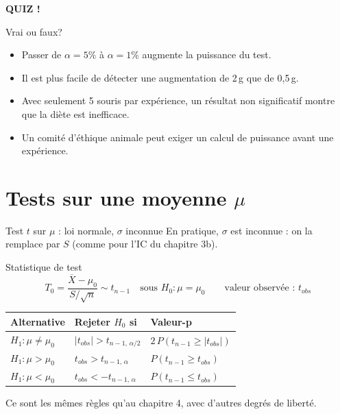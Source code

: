 \documentclass{BeamerTemplate}
\begin{document}
\begin{frame}[plain,t]
  \centerline{\LARGE\bfseries\alert{QUIZ !}}

  \medskip
  Vrai ou faux?
  \begin{itemize}\itemsep 1.1cm
    \item Passer de $\alpha = 5\%$ à $\alpha = 1\%$ augmente la puissance du test.
    \item<2-> Il est plus facile de détecter une augmentation de 2\,g que de 0,5\,g.
    \item<3-> Avec seulement 5 souris par expérience, un résultat non significatif montre que la diète est inefficace.
    \item<4-> Un comité d'éthique animale peut exiger un calcul de puissance avant une expérience.
  \end{itemize}
\end{frame}

\section{Tests sur une moyenne \texorpdfstring{$\mu$}{mu}}

\begin{frame}[t]{Test $t$ sur $\mu$ : loi normale, $\sigma$ inconnue}
  En pratique, $\sigma$ est inconnue : on la remplace par $S$ (comme pour l'IC du chapitre 3b).
  \begin{Boite}{Statistique de test}
    \vspace{-2mm}
    $$T_0 = \frac{\overline{X} - \mu_0}{S/\sqrt{n}} \sim t_{n-1} \quad \text{sous } H_0 : \mu = \mu_0 \qquad \text{valeur observée : } t_{obs}$$
  \end{Boite}

  \vspace{-3mm}
  \centering
  \renewcommand{\arraystretch}{1.3}
  \small
  \begin{tabular}{lll}\toprule
    \textbf{Alternative} & \textbf{Rejeter $H_0$ si} & \textbf{Valeur-p} \\ \midrule
    $H_1 : \mu \ne \mu_0$ & $|t_{obs}| > t_{n-1,\,\alpha/2}$ & $2\,P(t_{n-1} \ge |t_{obs}|)$ \\
    $H_1 : \mu > \mu_0$ & $t_{obs} > t_{n-1,\,\alpha}$ & $P(t_{n-1} \ge t_{obs})$ \\
    $H_1 : \mu < \mu_0$ & $t_{obs} < -t_{n-1,\,\alpha}$ & $P(t_{n-1} \le t_{obs})$ \\ \bottomrule
  \end{tabular}

  \raggedright
  \smallskip
  Ce sont les mêmes règles qu'au chapitre 4, avec d'autres degrés de liberté.
\end{frame}
\end{document}
